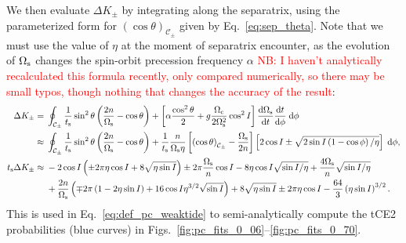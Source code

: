\documentclass[
        fleqn,
        usenatbib,
    ]{mnras}
\newcommand*{\rd}[2]{\frac{\mathrm{d}#1}{\mathrm{d}#2}}
\newcommand*{\p}[1]{\left(#1\right)}
\newcommand*{\s}[1]{\left[#1\right]}
\begin{document}
We then evaluate $\Delta K_{\pm}$ by integrating along the separatrix, using the
parameterized form for $\p{\cos \theta}_{\mathcal{C}_\pm}$ given by
Eq.~\eqref{eq:sep_theta}. Note that we must use the value of $\eta$ at the
moment of separatrix encounter, as the evolution of $\Omega_{\rm s}$ changes the
spin-orbit precession frequency $\alpha$ \textcolor{red}{NB\@: I haven't analytically
recalculated this formula recently, only compared numerically, so there may be
small typos, though nothing that changes the accuracy of the result}:
\begin{align}
    \Delta K_{\pm} ={}& \oint_{\mathcal{C}_{\pm}}
        \frac{1}{t_{\rm s}}\sin^2\theta
            \p{\frac{2n}{\Omega_{\rm s}} - \cos\theta}
         +
            \s{\alpha\frac{\cos^2\theta}{2} + g\frac{\Omega_{\rm
            c}}{2\Omega_{\rm s}^2}\cos^2 I}\rd{\Omega_{\rm
            s}}{t}\rd{t}{\phi}\;\mathrm{d}\phi\\
     \approx{}& \oint_{\mathcal{C}_{\pm}}
        \frac{1}{t_{\rm s}}\sin^2\theta
            \p{\frac{2n}{\Omega_{\rm s}} - \cos\theta}
        + \frac{1}{t_{\rm s}}\frac{n}{\Omega_{\rm s}\eta}
            \s{\p{\cos \theta}_{\mathcal{C}_{\pm}} - \frac{\Omega_{\rm s}}{2n}}
            \s{2 \cos I \pm \sqrt{2 \sin I\p{1 - \cos \phi} / \eta}}
            \;\mathrm{d}\phi,\\
    t_{\rm s} \Delta K_{\pm} \approx{}&
        -2\cos I\p{\pm 2\pi \eta \cos I + 8\sqrt{\eta \sin I}}
        \pm 2\pi \frac{\Omega_{\rm s}}{n}\cos I
        - 8\eta \cos I \sqrt{\sin I / \eta}
            + \frac{4\Omega_{\rm s}}{n}\sqrt{\sin I/\eta}\nonumber\\
        &+ \frac{2n}{\Omega_{\rm s}}\p{\mp 2\pi\p{1 - 2\eta \sin I}
            + 16\cos I \eta^{3/2}\sqrt{\sin I}}
            + 8\sqrt{\eta \sin I}
            \pm 2 \pi \eta \cos I
            - \frac{64}{3} \p{\eta \sin I}^{3/2}.\label{eq:app_deltaK}
\end{align}
This is used in Eq.~\eqref{eq:def_pc_weaktide} to semi-analytically compute the
tCE2 probabilities (blue curves) in
Figs.~\ref{fig:pc_fits_0_06}--\ref{fig:pc_fits_0_70}.

\label{lastpage} %
\end{document}
